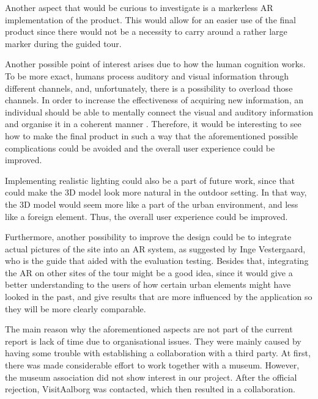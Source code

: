 Another aspect that would be curious to investigate is a markerless AR implementation of the product. This would allow for an easier use of the final product since there would not be a necessity to carry around a rather large marker during the guided tour.
  
Another possible point of interest arises due to how the human cognition works. To be more exact, humans process auditory and visual information through different channels, and, unfortunately, there is a possibility to overload those channels. In order to increase the effectiveness of acquiring new information, an individual should be able to mentally connect the visual and auditory information and organise it in a coherent manner \cite{audiovisual_learning}. Therefore, it would be interesting to see how to make the final product in such a way that the aforementioned possible complications could be avoided and the overall user experience could be improved.

Implementing realistic lighting could also be a part of future work, since that could make the 3D model look more natural in the outdoor setting. In that way, the 3D model would seem more like a part of the urban environment, and less like a foreign element. Thus, the overall user experience could be improved.

Furthermore, another possibility to improve the design could be to integrate actual pictures of the site into an AR system, as suggested by Inge Vestergaard, who is the guide that aided with the evaluation testing. Besides that, integrating the AR on other sites of the tour might be a good idea, since it would give a better understanding to the users of how certain urban elements might have looked in the past, and give results that are more influenced by the application so they will be more clearly comparable. 

The main reason why the aforementioned aspects are not part of the current report is lack of time due to organisational issues. They were mainly caused by having some trouble with establishing a collaboration with a third party. At first, there was made considerable effort to work together with a museum. However, the museum association did not show interest in our project. After the official rejection, VisitAalborg was contacted, which then resulted in a collaboration. 

